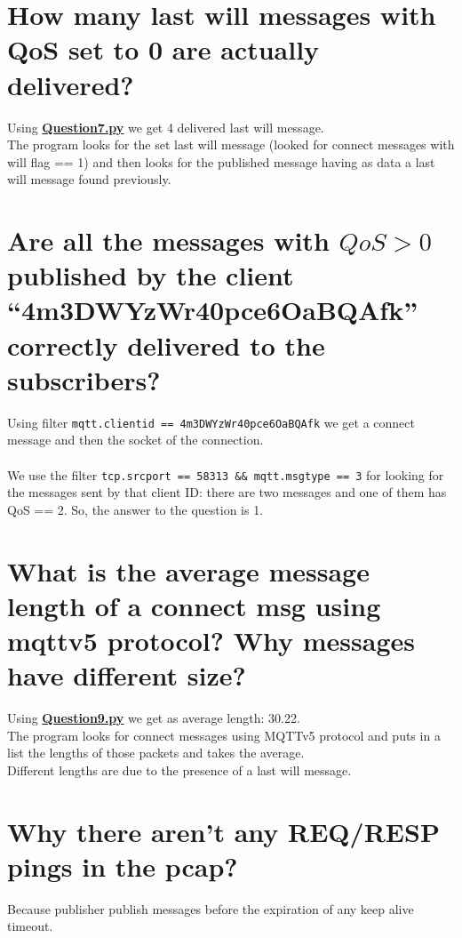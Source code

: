 \documentclass{article} %
\begin{document}
\section{\large{How many last will messages with QoS set to 0 are actually delivered?}} 
    Using \href{https://github.com/LucaFerraro/IoT-HomeChallenge/blob/master/3/Question7.py}{\textcolor{url_blue}{\textbf{Question7.py}}} we get 4 delivered last will message. \\
    The program looks for the set last will message (looked for connect messages with will flag == 1) and then looks for the published message having as data a last will message found previously.

   
\section{\large{Are all the messages with $QoS > 0$ published by the client “4m3DWYzWr40pce6OaBQAfk” correctly delivered to the subscribers?}}
    Using filter \texttt{mqtt.clientid == 4m3DWYzWr40pce6OaBQAfk} we get a connect message and then the socket of the connection. \\ \\
    We use the filter \texttt{tcp.srcport == 58313 \&\& mqtt.msgtype == 3} for looking for the messages sent by that client ID: 
    there are two messages and one of them has QoS == 2. So, the answer to the question is 1.


\section{\large{What is the average message length of a connect msg using mqttv5 protocol? Why messages have different size?}}
    Using \href{https://github.com/LucaFerraro/IoT-HomeChallenge/blob/master/3/Question9.py}{\textcolor{url_blue}{\textbf{Question9.py}}} we get as average length: 30.22. \\
    The program looks for connect messages using MQTTv5 protocol and puts in a list the lengths of those packets and takes the average. \\
    Different lengths are due to the presence of a last will message.


\section{\large{Why there aren’t any REQ/RESP pings in the pcap?}}
Because publisher publish messages before the expiration of any keep alive timeout.
\end{document}
